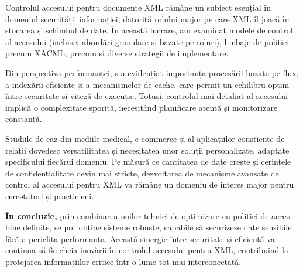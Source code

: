 \documentclass[runningheads]{llncs}
\begin{document}
Controlul accesului pentru documente XML rămâne un subiect esențial în domeniul securității informației, datorită rolului major pe care XML îl joacă în stocarea și schimbul de date. În această lucrare, am examinat modele de control al accesului (inclusiv abordări granulare și bazate pe roluri), limbaje de politici precum XACML, precum și diverse strategii de implementare.

Din perspectiva performanței, s-a evidențiat importanța procesării bazate pe flux, a indexării eficiente și a mecanismelor de cache, care permit un echilibru optim între securitate și viteză de execuție. Totuși, controlul mai detaliat al accesului implică o complexitate sporită, necesitând planificare atentă și monitorizare constantă.

Studiile de caz din mediile medical, e-commerce și al aplicațiilor conștiente de relații dovedesc versatilitatea și necesitatea unor soluții personalizate, adaptate specificului fiecărui domeniu. Pe măsură ce cantitatea de date crește și cerințele de confidențialitate devin mai stricte, dezvoltarea de mecanisme avansate de control al accesului pentru XML va rămâne un domeniu de interes major pentru cercetători și practicieni.

\noindent
\textbf{În concluzie,} prin combinarea noilor tehnici de optimizare cu politici de acces bine definite, se pot obține sisteme robuste, capabile să securizeze date sensibile fără a periclita performanța. Această sinergie între securitate și eficiență va continua să fie cheia inovării în controlul accesului pentru XML, contribuind la protejarea informațiilor critice într-o lume tot mai interconectată.
\end{document}
